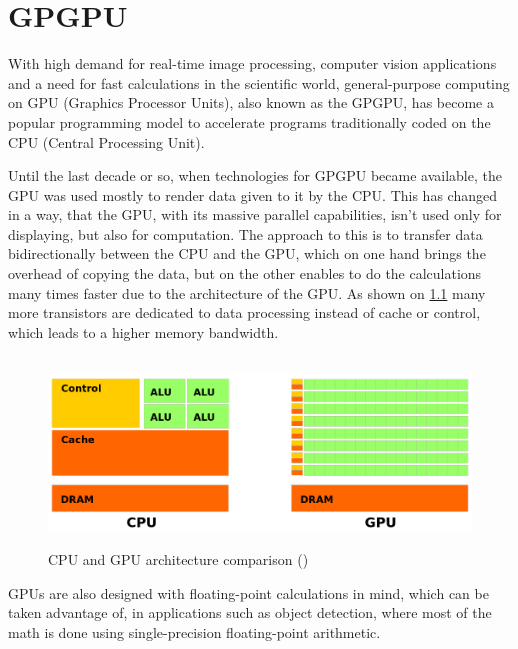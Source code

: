 
\chapter{GPGPU}

With high demand for real-time image processing, computer vision applications and a need for fast calculations in the scientific world, general-purpose computing on GPU (Graphics Processor Units), also known as the GPGPU, has become a popular programming model to accelerate programs traditionally coded on the CPU (Central Processing Unit).

Until the last decade or so, when technologies for GPGPU became available, the GPU was used mostly to render data given to it by the CPU. This has changed in a way, that the GPU, with its massive parallel capabilities, isn't used only for displaying, but also for computation. The approach to this is to transfer data bidirectionally between the CPU and the GPU, which on one hand brings the overhead of copying the data, but on the other enables to do the calculations many times faster due to the architecture of the GPU. As shown on \ref{fig:cpu-gpu} many more transistors are dedicated to data processing instead of cache or control, which leads to a higher memory bandwidth.

\begin{center}
\begin{figure}[h]
	\centering\includegraphics[height=5cm]{fig/cpu-gpu.png}
	\caption{CPU and GPU architecture comparison (\cite{cuda-toolkit-docs})}
	\label{fig:cpu-gpu}
\end{figure}
\end{center}

GPUs are also designed with floating-point calculations in mind, which can be taken advantage of, in applications such as object detection, where most of the math is done using single-precision floating-point arithmetic.

